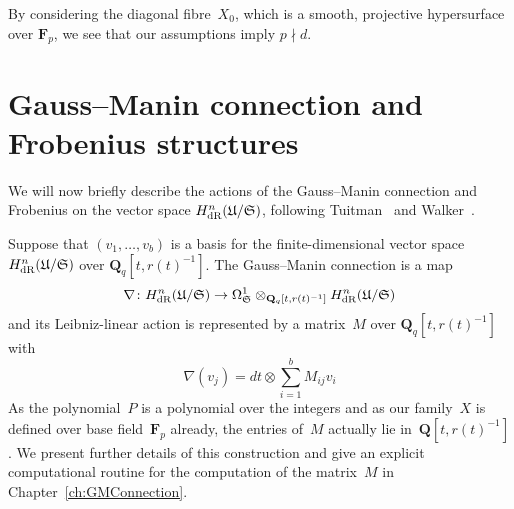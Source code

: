 \begin{rem}
By considering the diagonal fibre~$X_0$, which is a smooth, 
projective hypersurface over $\mathbf{F}_p$, we see that our 
assumptions imply $p \nmid d$.
\end{rem}


\section{Gauss--Manin connection and Frobenius structures}

We will now briefly describe the actions of the Gauss--Manin connection 
and Frobenius on the vector space $H_{\text{dR}}^{n}(\mathfrak{U}/\mathfrak{S})$, 
following Tuitman~\citep[\S 3.4.2, \S 3.6.1]{Tuitman2011} and 
Walker~\citep[\S 3.2.2.2]{Walker2009}.

Suppose that $(v_1,\dotsc,v_b)$ is a basis for the finite-dimensional 
vector space $H_{\text{dR}}^{n}(\mathfrak{U}/\mathfrak{S})$ over 
$\mathbf{Q}_q[t,r(t)^{-1}]$.  The Gauss--Manin connection is a map 
\begin{equation*}
\nabla \colon H_{\text{dR}}^{n}(\mathfrak{U}/\mathfrak{S}) 
    \rightarrow \Omega_{\mathfrak{S}}^{1}
    \otimes_{\mathbf{Q}_q[t,r(t)^{-1}]} H_{\text{dR}}^{n}(\mathfrak{U}/\mathfrak{S})
\end{equation*}
and its Leibniz-linear action is represented by a matrix~$M$ over 
$\mathbf{Q}_q[t,r(t)^{-1}]$ with 
\begin{equation*}
\nabla(v_j) = dt \otimes \sum_{i=1}^{b} M_{ij} v_i
\end{equation*}
As the polynomial~$P$ is a polynomial over the integers and 
as our family~$X$ is defined over base field~$\mathbf{F}_p$ 
already, the entries of~$M$ actually lie in~$\mathbf{Q}[t,r(t)^{-1}]$. 
We present further details of this construction and give an explicit 
computational routine for the computation of the matrix~$M$ in 
Chapter~\ref{ch:GMConnection}.

